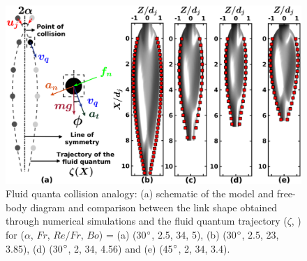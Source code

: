 \begin{figure}
	\centering
	\includegraphics[width=\linewidth]{chapters/jetJet/Figure10}
	\caption{Fluid quanta collision analogy: (a) schematic of the model and free-body diagram and comparison between the link shape obtained through numerical simulations and the fluid quantum trajectory ($\zeta$, \protect\MarkerSquareRed) for ($\alpha$, $Fr$, $Re/Fr$, $Bo$) = (a) (30$\degree$, 2.5, 34, 5), (b) (30$\degree$, 2.5, 23, 3.85), (d) (30$\degree$, 2, 34, 4.56) and (e) (45$\degree$, 2, 34, 3.4).}
	\label{Figure::analytical}
\end{figure}%

